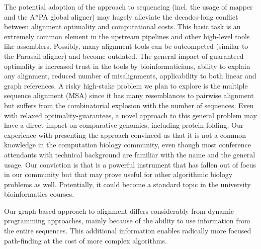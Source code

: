 
The potential adoption of the \A approach to sequencing (incl. the usage of
\astarix mapper and the A*PA global aligner) may hugely alleviate the
decades-long conflict between alignment optimality and computational costs. This
basic task is an extremely common element in the upstream pipelines and other
high-level tools like assemblers. Possibly, many alignment tools can be
outcompeted (similar to the Parasail aligner) and become outdated. The general
impact of guaranteed optimality is increased trust in the tools by
bioinformaticians, ability to explain any alignment, reduced number of
misalignments, applicability to both linear and graph references. A risky
high-stake problem we plan to explore is the multiple sequence alignment (MSA)
since it has many resemblances to pairwise alignment but suffers from the
combinatorial explosion with the number of sequences. Even with relaxed
optimality-guarantees, a novel approach to this general problem may have a
direct impact on comparative genomics, including protein folding. Our experience
with presenting the \A approach convinced us that it is not a common knowledge
in the computation biology community, even though most conference attendants
with technical background are familiar with the name and the general usage. Our
conviction is that \A is a powerful instrument that has fallen out of focus in
our community but that may prove useful for other algorithmic biology problems
as well. Potentially, it could become a standard topic in the university
bioinformatics courses.

Our graph-based approach to alignment differs considerably from dynamic
programming approaches, mainly because of the ability to use information from the
entire sequences. This additional information enables radically more focused
path-finding at the cost of more complex algorithms.

